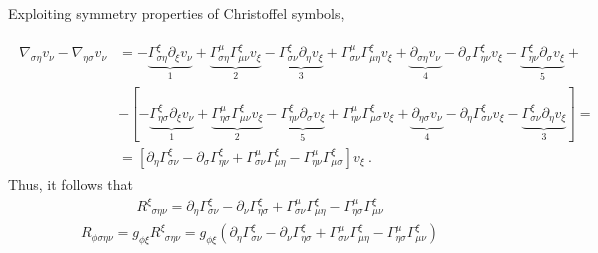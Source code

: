 \documentclass[letterpaper,10pt,english]{jupyterBook}
\begin{document}
\sphinxAtStartPar
Exploiting symmetry properties of Christoffel symbols,

\sphinxAtStartPar
{} 
\begin{equation*}
\begin{split}\begin{aligned}
  \nabla_{\sigma \eta} v_{\nu} - \nabla_{\eta \sigma} v_{\nu}
  & = 
    - \underbrace{\Gamma_{\sigma \eta}^{\xi} \partial_{\xi} v_{\nu}}_{1} + \underbrace{\Gamma_{\sigma \eta}^{\mu} \Gamma_{\mu \nu}^{\xi} v_{\xi}}_{2}
    - \underbrace{\Gamma_{\sigma \nu }^{\xi} \partial_{\eta} v_{\xi}}_{3} + \Gamma_{\sigma \nu }^{\mu} \Gamma_{\mu \eta}^{\xi} v_{\xi}
    + \underbrace{\partial_{\sigma \eta} v_{\nu}}_{4} - \partial_{\sigma} \Gamma_{\eta \nu}^{\xi} v_{\xi} - \underbrace{\Gamma_{\eta \nu}^{\xi} \partial_{\sigma} v_{\xi}}_{5} + \\
  & - \left[ 
    - \underbrace{\Gamma_{\eta \sigma}^{\xi} \partial_{\xi} v_{\nu}}_{1} + \underbrace{\Gamma_{\eta \sigma}^{\mu} \Gamma_{\mu \nu}^{\xi} v_{\xi}}_{2}
    - \underbrace{\Gamma_{\eta   \nu }^{\xi} \partial_{\sigma} v_{\xi}}_{5} + \Gamma_{\eta \nu }^{\mu} \Gamma_{\mu \sigma}^{\xi} v_{\xi} 
    + \underbrace{\partial_{\eta \sigma} v_{\nu}}_{4} - \partial_{\eta} \Gamma_{\sigma \nu}^{\xi} v_{\xi} - \underbrace{\Gamma_{\sigma \nu}^{\xi} \partial_{\eta} v_{\xi} }_{3}
  \right] = \\
  & = \left[ \partial_{\eta} \Gamma_{\sigma \nu}^{\xi} - \partial_{\sigma} \Gamma_{\eta \nu}^{\xi} + \Gamma_{\sigma \nu}^{\mu} \Gamma_{\mu \eta}^{\xi} - \Gamma_{\eta \nu}^{\mu} \Gamma_{\mu \sigma}^{\xi} \right] v_{\xi} \ . 
\end{aligned}\end{split}
\end{equation*}
\sphinxAtStartPar
Thus, it follows that
\begin{equation*}
\begin{split}R^{\xi}_{\ \ \sigma \eta \nu} = \partial_{\eta} \Gamma_{\sigma \nu}^{\xi} - \partial_{\nu} \Gamma_{\eta \sigma}^{\xi} + \Gamma_{\sigma \nu}^{\mu} \Gamma_{\mu \eta}^{\xi} - \Gamma_{\eta \sigma}^{\mu} \Gamma_{\mu \nu}^{\xi}\end{split}
\end{equation*}\begin{equation*}
\begin{split}R_{\phi \sigma \eta \nu} = g_{\phi \xi} R^{\xi}_{\ \ \sigma \eta \nu} = g_{\phi \xi} \left( \partial_{\eta} \Gamma_{\sigma \nu}^{\xi} - \partial_{\nu} \Gamma_{\eta \sigma}^{\xi} + \Gamma_{\sigma \nu}^{\mu} \Gamma_{\mu \eta}^{\xi} - \Gamma_{\eta \sigma}^{\mu} \Gamma_{\mu \nu}^{\xi}\right)\end{split}
\end{equation*}
\end{document}
